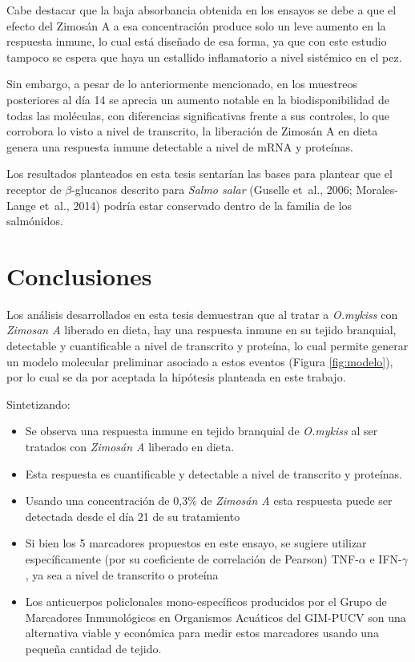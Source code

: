 \documentclass[12pt,letterpaper,oneside]{scrbook}
\begin{document}
Cabe destacar que la baja absorbancia obtenida en los ensayos se debe a
que el efecto del Zimosán A a esa concentración produce solo un leve
aumento en la respuesta inmune, lo cual está diseñado de esa forma, ya
que con este estudio tampoco se espera que haya un estallido
inflamatorio a nivel sistémico en el pez.

Sin embargo, a pesar de lo anteriormente mencionado, en los muestreos
posteriores al día 14 se aprecia un aumento notable en la
biodisponibilidad de todas las moléculas, con diferencias significativas
frente a sus controles, lo que corrobora lo visto a nivel de transcrito,
la liberación de Zimosán A en dieta genera una respuesta inmune
detectable a nivel de mRNA y proteínas.

Los resultados planteados en esta tesis sentarían las bases para
plantear que el receptor de \(\beta\)-glucanos descrito para
\emph{Salmo salar} (Guselle et~al., 2006; Morales-Lange et~al., 2014)
podría estar conservado dentro de la familia de los salmónidos.
\chapter{Conclusiones}

Los análisis desarrollados en esta tesis demuestran que al tratar a
\emph{O.mykiss} con \emph{Zimosan A} liberado en dieta, hay una
respuesta inmune en su tejido branquial, detectable y cuantificable a
nivel de transcrito y proteína, lo cual permite generar un modelo
molecular preliminar asociado a estos eventos (Figura \ref{fig:modelo}),
por lo cual se da por aceptada la hipótesis planteada en este trabajo.

Sintetizando:

\begin{itemize}
\item Se observa una respuesta inmune en tejido branquial de \emph{O.mykiss} al ser tratados con \emph{Zimosán A} liberado en dieta.
\item Esta respuesta es cuantificable y detectable a nivel de transcrito y proteínas.
\item Usando una concentración de 0,3\% de \emph{Zimosán A} esta respuesta puede ser detectada desde el día 21 de su tratamiento
\item Si bien los 5 marcadores propuestos en este ensayo, se sugiere utilizar específicamente (por su coeficiente de correlación de Pearson) TNF-$\alpha$ e IFN-$\gamma$, ya sea a nivel de transcrito o proteína
\item Los anticuerpos policlonales mono-específicos producidos por el Grupo de Marcadores Inmunológicos en Organismos Acuáticos del GIM-PUCV son una alternativa viable y económica para medir estos marcadores usando una pequeña cantidad de tejido.
\end{itemize}
\end{document}
